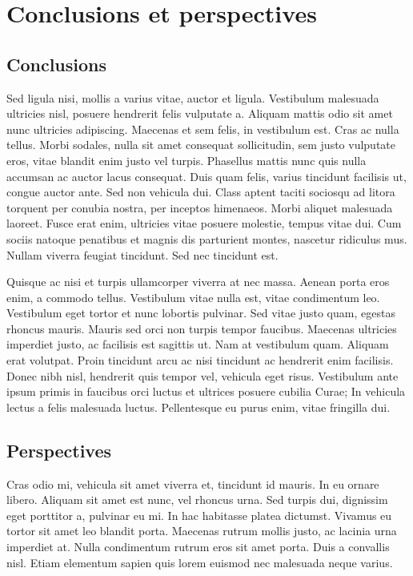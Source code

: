 \chapter{Conclusions et perspectives}
\section{Conclusions}

 Sed ligula nisi, mollis a varius vitae, auctor et ligula. Vestibulum malesuada ultricies nisl, posuere hendrerit felis vulputate a. Aliquam mattis odio sit amet nunc ultricies adipiscing. Maecenas et sem felis, in vestibulum est. Cras ac nulla tellus. Morbi sodales, nulla sit amet consequat sollicitudin, sem justo vulputate eros, vitae blandit enim justo vel turpis. Phasellus mattis nunc quis nulla accumsan ac auctor lacus consequat. Duis quam felis, varius tincidunt facilisis ut, congue auctor ante. Sed non vehicula dui. Class aptent taciti sociosqu ad litora torquent per conubia nostra, per inceptos himenaeos. Morbi aliquet malesuada laoreet. Fusce erat enim, ultricies vitae posuere molestie, tempus vitae dui. Cum sociis natoque penatibus et magnis dis parturient montes, nascetur ridiculus mus. Nullam viverra feugiat tincidunt. Sed nec tincidunt est.

Quisque ac nisi et turpis ullamcorper viverra at nec massa. Aenean porta eros enim, a commodo tellus. Vestibulum vitae nulla est, vitae condimentum leo. Vestibulum eget tortor et nunc lobortis pulvinar. Sed vitae justo quam, egestas rhoncus mauris. Mauris sed orci non turpis tempor faucibus. Maecenas ultricies imperdiet justo, ac facilisis est sagittis ut. Nam at vestibulum quam. Aliquam erat volutpat. Proin tincidunt arcu ac nisi tincidunt ac hendrerit enim facilisis. Donec nibh nisl, hendrerit quis tempor vel, vehicula eget risus. Vestibulum ante ipsum primis in faucibus orci luctus et ultrices posuere cubilia Curae; In vehicula lectus a felis malesuada luctus. Pellentesque eu purus enim, vitae fringilla dui.

\section{Perspectives}

 Cras odio mi, vehicula sit amet viverra et, tincidunt id mauris. In eu ornare libero. Aliquam sit amet est nunc, vel rhoncus urna. Sed turpis dui, dignissim eget porttitor a, pulvinar eu mi. In hac habitasse platea dictumst. Vivamus eu tortor sit amet leo blandit porta. Maecenas rutrum mollis justo, ac lacinia urna imperdiet at. Nulla condimentum rutrum eros sit amet porta. Duis a convallis nisl. Etiam elementum sapien quis lorem euismod nec malesuada neque varius.

